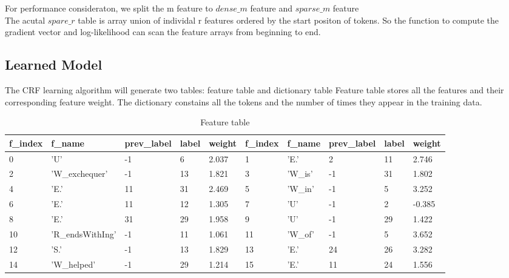 For performance consideraton, we split the m feature to $dense\_m$ feature and $sparse\_m$ feature\\
The acutal $spare\_r$ table is array union of individal r features ordered by the start positon of tokens.
So the function to compute the gradient vector and log-likelihood can scan the feature arrays from beginning to end.

\subsection{Learned Model}
The CRF learning algorithm will generate two tables: feature table and dictionary table
Feature table stores all the features and their corresponding feature weight.
The dictionary constains all the tokens and the number of times they appear in the training data.\\
\begin {table}[h]
\caption {Feature table} \label{tab:featuretbl}
\begin{center}
    \scriptsize
    \begin{tabular}{ | l | l | l | l | l || l | l | l | l | l | }
    \hline
    f\_index & f\_name & prev\_label & label & weight & f\_index & f\_name & prev\_label & label & weight\\
    \hline
    0&'U'&-1&6&2.037& 1&'E.'&2&11&2.746   \\
    2&'W\_exchequer'&-1&13&1.821& 3&'W\_is'&-1&31&1.802 \\
    4&'E.'&11&31&2.469& 5&'W\_in'&-1&5&3.252 \\
    6&'E.'&11&12&1.305& 7&'U'&-1&2&-0.385 \\
    8&'E.'&31&29&1.958& 9&'U'&-1&29&1.422 \\
    10&'R\_endsWithIng'&-1&11&1.061&11&'W\_of'&-1&5&3.652 \\
    12&'S.'&-1&13&1.829& 13&'E.'&24&26&3.282 \\
    14&'W\_helped'&-1&29&1.214& 15&'E.'&11&24&1.556 \\
    \hline
    \end{tabular}
\end{center}
\end {table}

